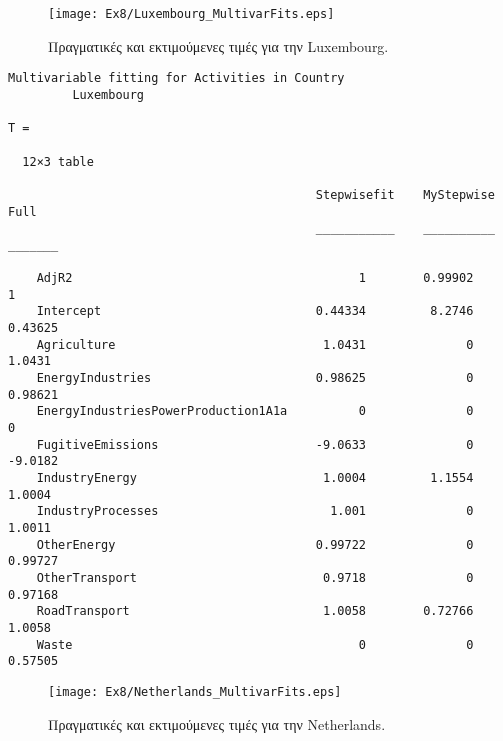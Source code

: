 \documentclass[11pt]{scrartcl} %
\begin{document}
\begin{figure}[H]

	\centering
	\texttt{[image: Ex8/Luxembourg\_MultivarFits.eps]}	
\caption{Πραγματικές και εκτιμούμενες τιμές για την Luxembourg.}
\label{fig:z810} 
\end{figure}



\begin{Verbatim}[fontsize=\small]
Multivariable fitting for Activities in Country
 	 	 Luxembourg

T =

  12×3 table

                                           Stepwisefit    MyStepwise     Full  
                                           ___________    __________    _______

    AdjR2                                        1        0.99902             1
    Intercept                              0.44334         8.2746       0.43625
    Agriculture                             1.0431              0        1.0431
    EnergyIndustries                       0.98625              0       0.98621
    EnergyIndustriesPowerProduction1A1a          0              0             0
    FugitiveEmissions                      -9.0633              0       -9.0182
    IndustryEnergy                          1.0004         1.1554        1.0004
    IndustryProcesses                        1.001              0        1.0011
    OtherEnergy                            0.99722              0       0.99727
    OtherTransport                          0.9718              0       0.97168
    RoadTransport                           1.0058        0.72766        1.0058
    Waste                                        0              0       0.57505
\end{Verbatim}



\begin{figure}[H]

	\centering
	\texttt{[image: Ex8/Netherlands\_MultivarFits.eps]}	
\caption{Πραγματικές και εκτιμούμενες τιμές για την Netherlands.}
\label{fig:z811} 
\end{figure}
\end{document}
